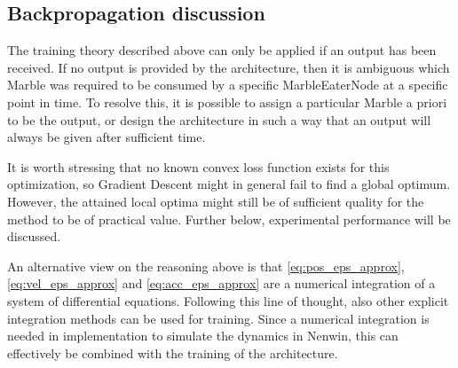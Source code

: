 


\subsection{Backpropagation discussion}
The training theory described above can only be applied if an output has been received. If no output is provided by the architecture, then it is ambiguous which Marble was required to be consumed by a specific MarbleEaterNode at a specific point in time. To resolve this, it is possible to assign a particular Marble a priori to be the output, or design the architecture in such a way that an output will always be given after sufficient time.

It is worth stressing that no known convex loss function exists for this optimization, so Gradient Descent might in general fail to find a global optimum. However, the attained local optima might still be of sufficient quality for the method to be of practical value. Further below, experimental performance will be discussed.


An alternative view on the reasoning above is that \eqref{eq:pos_eps_approx}, \eqref{eq:vel_eps_approx} and \eqref{eq:acc_eps_approx} are a numerical integration of a system of differential equations. Following this line of thought, also other explicit integration methods can be used for training. Since a numerical integration is needed in implementation to simulate the dynamics in Nenwin, this can effectively be combined with the training of the architecture.